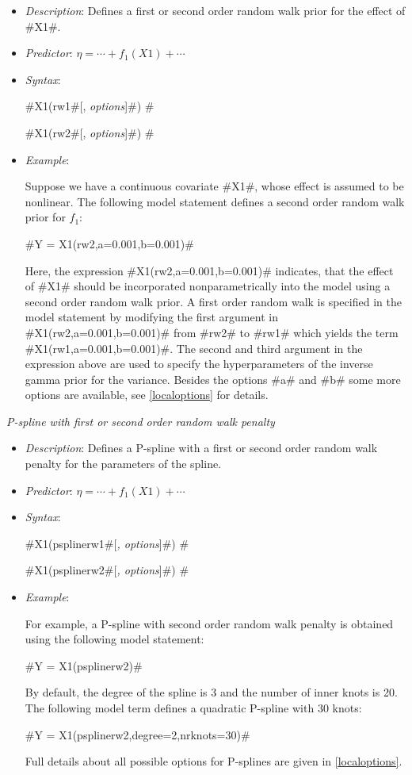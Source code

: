 \begin{itemize}
\item[] {\em Description}: Defines a first or second order random walk prior for the effect of #X1#.
\item[] {\em Predictor}: $\eta = \cdots + f_1(X1) + \cdots $
\item[] {\em Syntax}:

#X1(rw1#[, {\em options}]#) #

#X1(rw2#[, {\em options}]#) #
\item[] {\em Example}:

Suppose we have a continuous covariate #X1#, whose effect is
assumed to be nonlinear. The following model statement defines a
second order random walk prior for $f_1$:

#Y = X1(rw2,a=0.001,b=0.001)#

Here, the expression #X1(rw2,a=0.001,b=0.001)# indicates, that the
effect of #X1# should be incorporated nonparametrically into the
model using a second order random walk prior. A first order random
walk is specified in the model statement by modifying the first
argument in #X1(rw2,a=0.001,b=0.001)# from #rw2# to #rw1# which
yields the term #X1(rw1,a=0.001,b=0.001)#. The second and third
argument in the expression above are used to specify the
hyperparameters of the inverse gamma prior for the variance.
Besides the options #a# and #b# some more options are available,
see \autoref{localoptions} for details.
\end{itemize}

\vspace{0.5cm}

{\em P-spline with first or second order random walk penalty}

\begin{itemize}
\item[] {\em Description}: Defines a P-spline with a first or second order random walk penalty for
the parameters of the spline.
\item[] {\em Predictor}: $\eta =  \cdots + f_1(X1) + \cdots$
\item[] {\em Syntax}:

#X1(psplinerw1#[{\em , options}]#) #

#X1(psplinerw2#[{\em , options}]#) #
\item[] {\em Example}:

For example, a P-spline with second order random walk penalty is
obtained using the following model statement:

#Y = X1(psplinerw2)#

By default, the degree of the spline is 3 and the number of inner
knots is 20. The following model term defines a quadratic P-spline
with 30 knots:

#Y = X1(psplinerw2,degree=2,nrknots=30)#

Full details about all possible options for P-splines are given in
\autoref{localoptions}.
\end{itemize}


